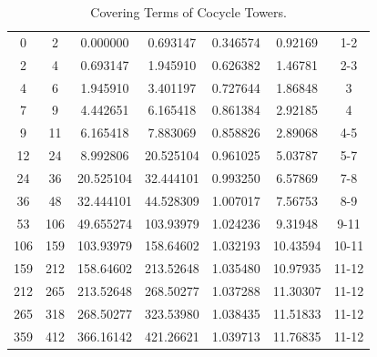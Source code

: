 \documentclass[12pt, oneside]{article}
\numberwithin{equation}{section}
\theoremstyle{definition}
\theoremstyle{plain}
\theoremstyle{remark}
\begin{document}
\begin{table}[h]
\centering
\small
\caption{Covering Terms of Cocycle Towers.}
\label{tab:cocycle-tower-growth}
\begin{tabular}{
S[table-format=6.0]
S[table-format=6.0]
S[table-format=6.6]
S[table-format=6.6]
S[table-format=1.6]
S[table-format=2.5]
c
}
\hline
{} &
 &
 &
 &
\chead{$\lambda_\Delta$} &
 &
 \\
\hline
   0 &     2 &  0.000000 &  0.693147 & 0.346574 &  0.92169 & 1-2 \\
   2 &     4 &  0.693147 &  1.945910 & 0.626382 &  1.46781 & 2-3 \\
   4 &     6 &  1.945910 &  3.401197 & 0.727644 &  1.86848 & 3 \\
\hline
   7 &     9 &  4.442651 &  6.165418 & 0.861384 &  2.92185 & 4 \\
   9 &    11 &  6.165418 &  7.883069 & 0.858826 &  2.89068 & 4-5 \\
\hline
  12 &    24 &  8.992806 & 20.525104 & 0.961025 &  5.03787 & 5-7 \\
  24 &    36 & 20.525104 & 32.444101 & 0.993250 &  6.57869 & 7-8 \\
  36 &    48 & 32.444101 & 44.528309 & 1.007017 &  7.56753 & 8-9 \\
\hline
  53 &   106 &  49.655274 & 103.93979 & 1.024236 &  9.31948 & 9-11 \\
 106 &   159 & 103.93979  & 158.64602 & 1.032193 & 10.43594 & 10-11 \\
 159 &   212 & 158.64602  & 213.52648 & 1.035480 & 10.97935 & 11-12 \\
 212 &   265 & 213.52648  & 268.50277 & 1.037288 & 11.30307 & 11-12 \\
 265 &   318 & 268.50277  & 323.53980 & 1.038435 & 11.51833 & 11-12 \\
\hline
 359 &   412 & 366.16142 & 421.26621 & 1.039713 & 11.76835 & 11-12 \\

\end{tabular}
\end{table}
\end{document}
